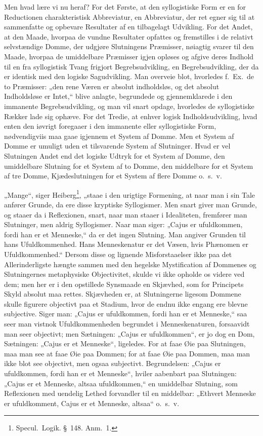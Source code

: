 \documentclass[12pt]{book}
\newcommand{\opage}[1]{\marginnote{\footnotesize\textit{[#1]}}}
\begin{document}
Men hvad lære vi nu heraf? For det Første, at den syllogistiske Form er en for Reductionen charakteristisk Abbreviatur, en Abbreviatur, der ret egner sig til at sammenfatte og
\opage{328}opbevare Resultater af en tilbagelagt Udvikling. %
 For det Andet, at den Maade, hvorpaa de vundne Resultater opfattes og fremstilles i de relativt selvstændige Domme, der udgjøre Slutningens Præmisser, nøiagtig svarer til den Maade, hvorpaa de umiddelbare Præmisser igjen opløses og afgive deres Indhold til en fra syllogistisk Tvang frigjort Begrebsudvikling, en Begrebsudvikling, der da er identisk med den logiske Sagudvikling. Man overveie blot, hvorledes f.\ Ex.\ de to Præmisser: „den rene Væren er absolut indholdsløs, og det absolut Indholdsløse er Intet,“ blive anlagte, begrundede og gjennemklarede i den immanente Begrebsudvikling, og man vil snart opdage, hvorledes de syllogistiske Rækker lade sig ophæve. For det Tredie, at enhver logisk Indholdsudvikling, hvad enten den iøvrigt foregaaer i den immanente eller syllogistiske Form, nødvendigviis maa gaae igjennem et System af Domme. Men et System af Domme er umuligt uden et tilsvarende System af Slutninger. Hvad er vel Slutningen Andet end det logiske Udtryk for et System af Domme, den umiddelbare Slutning for et System af to Domme, den middelbare for et System af tre Domme, Kjædeslutningen for et System af flere Domme o.\ s.\ v.

„Mange“, siger Heiberg\footnote{Specul.\ Logik. §~148. Anm.~1.}, %
„staae i den urigtige Formening, at naar man i sin Tale anfører Grunde, da ere disse kryptiske Syllogismer. Men snart giver man Grunde, og staaer da i Reflexionen, snart, naar man staaer i Idealiteten, fremfører man Slutninger, men aldrig Syllogismer. Naar man siger: „Cajus er ufuldkommen, fordi han er et Menneske,“ da er det ingen Slutning. Man angiver Grunden til hans Ufuldkommenhed. Hans Menneskenatur er det Væsen, hvis Phænomen er Ufuldkommenhed.“ Dersom disse og lignende Misforstaaelser ikke paa det Allerinderligste hængte sammen med den hegelske Mystification af Dommenes og
\opage{329}Slutningernes metaphysiske Objectivitet, skulde vi ikke opholde os videre ved dem; men her er i den opstillede Synsmaade en Skjævhed, som for Principets Skyld absolut maa rettes. Skjævheden er, at Slutningerne ligesom Dommene skulle figurere objectivt paa et Stadium, hvor de endnu ikke engang ere blevne subjective. Siger man: „Cajus er ufuldkommen, fordi han er et Menneske,“ saa seer man vistnok Ufuldkommenheden begrundet i Menneskenaturen, forsaavidt man seer objectivt; men Sætningen: „Cajus er ufuldkommen“, er jo dog en Dom, Sætningen: „Cajus er et Menneske“, ligeledes. For at faae Øie paa Slutningen, maa man see at faae Øie paa Dommen; for at faae Øie paa Dommen, maa man ikke blot see objectivt, men ogsaa subjectivt. Begrundelsen: „Cajus er ufuldkommen, fordi han er et Menneske“, hviler aabenbart paa Slutningen: „Cajus er et Menneske, altsaa ufuldkommen,“ en umiddelbar Slutning, som Reflexionen med uendelig Lethed forvandler til en middelbar: „Ethvert Menneske er ufuldkomment, Cajus er et Menneske, altsaa“ o.\ s.\ v.
\end{document}
